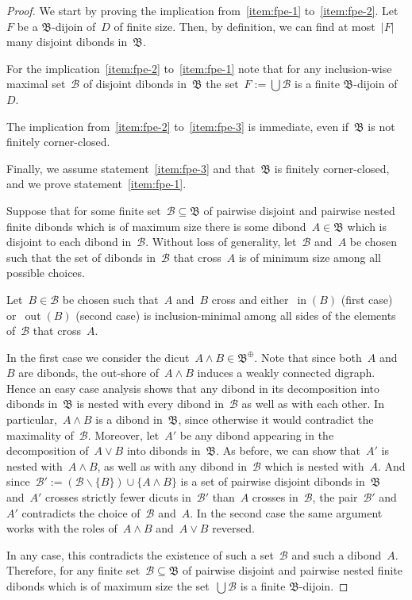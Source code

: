 \documentclass[reqno, 12pt]{amsart}
\numberwithin{equation}{section}
\numberwithin{figure}{section}
\let\setminus=\smallsetminus
\theoremstyle{plain}
\theoremstyle{definition}
\newcommand{\abs}[1]{\ensuremath{{\lvert {#1} \rvert}}}
\DeclareMathOperator{\insh}{in}
\DeclareMathOperator{\outsh}{out}
\begin{document}
\begin{proof}
    We start by proving the implication from~\ref{item:fpe-1} to~\ref{item:fpe-2}. 
    Let~$F$ be a $\mathfrak{B}$-dijoin of~$D$ of finite size. 
    Then, by definition, we can find at most~$\abs{F}$ many disjoint dibonds in~$\mathfrak{B}$. 

    For the implication~\ref{item:fpe-2} to~\ref{item:fpe-1} note that for any inclusion-wise maximal set~$\mathcal{B}$ of disjoint dibonds in~$\mathfrak{B}$ the set~${F := \bigcup \mathcal{B}}$ is a finite $\mathfrak{B}$-dijoin of~$D$. 
    
    The implication from~\ref{item:fpe-2} to~\ref{item:fpe-3} is immediate, 
    even if~$\mathfrak{B}$ is not finitely corner-closed. 
    
    Finally, we assume statement~\ref{item:fpe-3} and that~$\mathfrak{B}$ is finitely corner-closed, and we prove statement~\ref{item:fpe-1}. 
    
    Suppose that for some finite set~$\mathcal{B} \subseteq \mathfrak{B}$ of pairwise disjoint and pairwise nested finite dibonds which is of maximum size there is some dibond~${A \in \mathfrak{B}}$ which is disjoint to each dibond in~$\mathcal{B}$. 
    Without loss of generality, let~$\mathcal{B}$ and~$A$ be chosen such that the set of dibonds in~$\mathcal{B}$ that cross~$A$ is of minimum size among all possible choices. 
    
    Let~${B \in \mathcal{B}}$ be chosen such that~$A$ and~$B$ cross and either~$\insh(B)$ (first case) or~$\outsh(B)$ (second case) is inclusion-minimal among all sides of the elements of~$\mathcal{B}$ that cross~$A$.
    
    In the first case we consider the dicut~${A \wedge B \in \mathfrak{B}^\oplus}$. 
    Note that since both~$A$ and~$B$ are dibonds, the out-shore of~${A \wedge B}$ induces a weakly connected digraph. 
    Hence an easy case analysis shows that any dibond in its decomposition into dibonds in~$\mathfrak{B}$ is nested with every dibond in~$\mathcal{B}$ as well as with each other. 
    In particular,~${A \wedge B}$ is a dibond in~$\mathfrak{B}$, since otherwise it would contradict the maximality of~$\mathcal{B}$. 
    Moreover, let~${A'}$ be any dibond appearing in the decomposition of~${A \vee B}$ into dibonds in~$\mathfrak{B}$. 
    As before, we can show that~$A'$ is nested with~${A \wedge B}$, as well as with any dibond in~${\mathcal{B}}$ which is nested with~$A$. 
    And since~${\mathcal{B}' := (\mathcal{B} \setminus \{ B \}) \cup \{ A \wedge B \}}$ is a set of pairwise disjoint dibonds in~$\mathfrak{B}$ and~$A'$ crosses strictly fewer dicuts in~$\mathcal{B}'$ than~$A$ crosses in~$\mathcal{B}$, the pair~$\mathcal{B}'$ and~$A'$ contradicts the choice of~$\mathcal{B}$ and~$A$. 
    In the second case the same argument works with the roles of~${A \wedge B}$ and~${A \vee B}$ reversed. 
    
    In any case, this contradicts the existence of such a set~$\mathcal{B}$ and such a dibond~$A$. 
    Therefore, for any finite set~$\mathcal{B} \subseteq \mathfrak{B}$ of pairwise disjoint and pairwise nested finite dibonds which is of maximum size the set~${\bigcup \mathcal{B}}$ is a finite $\mathfrak{B}$-dijoin.
\end{proof}
\end{document}
